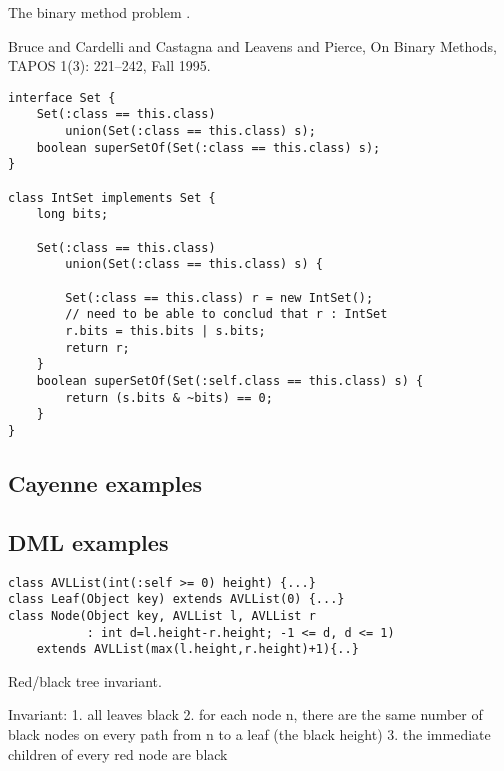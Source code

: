 The binary method problem \cite{bruce}.

Bruce and Cardelli and Castagna and Leavens and Pierce,
On Binary Methods, TAPOS 1(3): 221--242, Fall 1995.

{\footnotesize
\begin{verbatim}
interface Set {
    Set(:class == this.class)
        union(Set(:class == this.class) s);
    boolean superSetOf(Set(:class == this.class) s);
}

class IntSet implements Set {
    long bits;

    Set(:class == this.class)
        union(Set(:class == this.class) s) {

        Set(:class == this.class) r = new IntSet();
        // need to be able to conclud that r : IntSet
        r.bits = this.bits | s.bits;
        return r;
    }
    boolean superSetOf(Set(:self.class == this.class) s) {
        return (s.bits & ~bits) == 0;
    }
}
\end{verbatim}}

\subsection{Cayenne examples}


\subsection{DML examples}

{\footnotesize
\begin{verbatim}
class AVLList(int(:self >= 0) height) {...}
class Leaf(Object key) extends AVLList(0) {...}
class Node(Object key, AVLList l, AVLList r
           : int d=l.height-r.height; -1 <= d, d <= 1) 
    extends AVLList(max(l.height,r.height)+1){..}
\end{verbatim}}


Red/black tree invariant.

Invariant:
1. all leaves black
2. for each node n, there are the same number of black nodes on
every path from n to a leaf (the black height)
3. the immediate children of every red node are black

